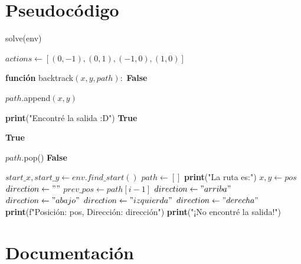 \documentclass[a4paper,12pt]{article}
\begin{document}
\section{Pseudocódigo}
\begin{algorithm}
\caption{solve(env)}
\begin{algorithmic}
\STATE $actions \gets [(0, -1), (0, 1), (-1, 0), (1, 0)]$  

\STATE \textbf{función} backtrack$(x, y, path):$
\RETURN \textbf{False}
\ENDIF

\STATE $path$.append$(x, y)$

\STATE \textbf{print}("Encontré la salida :D")
\RETURN \textbf{True}
\ENDIF

\RETURN \textbf{True}
\ENDIF
\ENDFOR

\STATE $path$.pop()
\RETURN \textbf{False}
\ENDSTATE

\STATE $start\_x, start\_y \gets env.find\_start()$
\STATE $path \gets []$
\STATE \textbf{print}("La ruta es:")
\STATE $x, y \gets pos$
\STATE $direction \gets ""$
\STATE {}
\STATE $prev\_pos \gets path[i - 1]$
\STATE $direction \gets "arriba"$
\STATE $direction \gets "abajo"$
\STATE $direction \gets "izquierda"$
\STATE $direction \gets "derecha"$
\ENDIF
\ENDIF
\STATE \textbf{print}(f"Posición: {pos}, Dirección: {dirección}")
\ENDFOR
\ELSE   
\STATE \textbf{print}("¡No encontré la salida!")
\ENDIF
\end{algorithmic}
\end{algorithm}


\section{Documentación}
\end{document}
